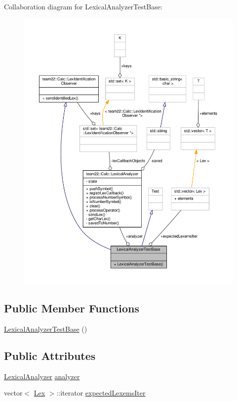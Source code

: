 Collaboration diagram for Lexical\+Analyzer\+Test\+Base\+:
\nopagebreak
\begin{figure}[H]
\begin{center}
\leavevmode
\includegraphics[width=350pt]{struct_lexical_analyzer_test_base__coll__graph}
\end{center}
\end{figure}
\subsection*{Public Member Functions}
\begin{DoxyCompactItemize}
\item 
\hyperlink{struct_lexical_analyzer_test_base_a260d79e4ec9a1b15f2c0c003ae2be078}{Lexical\+Analyzer\+Test\+Base} ()
\end{DoxyCompactItemize}
\subsection*{Public Attributes}
\begin{DoxyCompactItemize}
\item 
\hyperlink{classteam22_1_1_calc_1_1_lexical_analyzer}{Lexical\+Analyzer} \hyperlink{struct_lexical_analyzer_test_base_a4a9e40168e3b585b872642102a6dcb2b}{analyzer}
\item 
vector$<$ \hyperlink{classteam22_1_1_calc_1_1_lex}{Lex} $>$\+::iterator \hyperlink{struct_lexical_analyzer_test_base_a38cbed88c599877db18b7b7522f6b65f}{expected\+Lexems\+Iter}
\end{DoxyCompactItemize}


